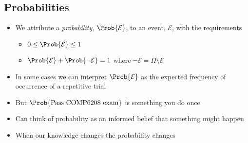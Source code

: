 
\begin{slide}
\section[-2]{Probabilities}

\pb
  \begin{itemize}
  \item We attribute a \emph{probability}, $\Prob{\mathcal{E}}$, to an event,
    $\mathcal{E}$, with the requirements\\
    \begin{minipage}{0.6\linewidth}
      \begin{itemize}
      \item $0\leq \Prob{\mathcal{E}} \leq 1$\pause
      \item $\Prob{\mathcal{E}} + \Prob{\neg\mathcal{E}} = 1$ where
        $\neg\mathcal{E} = \Omega \setminus \mathcal{E}$\pauseh
      \end{itemize}
    \end{minipage}\hfill
    \begin{minipage}{0.3\linewidth}
      \pause
    \end{minipage}
  \item In some cases we can interpret $\Prob{\mathcal{E}}$ as the
    expected frequency of occurrence of a repetitive trial\pauseh
  \item But $\Prob{\text{Pass COMP6208 exam}}$ is something you do
    once\pauseh
  \item Can think of probability as an informed belief that something
    might happen\pauseh
  \item When our knowledge changes the probability changes\pauseh
  \end{itemize}

\end{slide}


